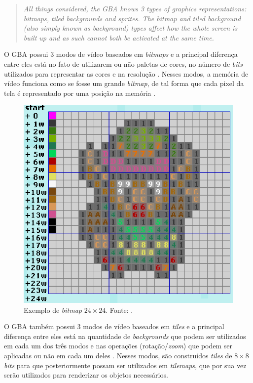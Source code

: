     \begin{quote}
      \textit{All things considered, the GBA knows 3 types of graphics representations: bitmaps, tiled backgrounds and sprites. The bitmap and tiled background (also simply known as background) types affect how the whole screen is built up and as such cannot both be activated at the same time.} \cite[p. 38]{tonc}
    \end{quote}

    O GBA possui 3 modos de vídeo baseados em \textit{bitmaps} e a principal diferença entre eles está no fato de utilizarem ou não paletas de cores, no número de \textit{bits} utilizados para representar as cores e na resolução \cite{harbour}. Nesses modos, a memória de vídeo funciona como se fosse um grande \textit{bitmap}, de tal forma que cada pixel da tela é representado por uma posição na memória \cite{tonc}.

    \begin{figure}[H]
    \centering \includegraphics[keepaspectratio=true,scale=0.6]{figuras/link-bitmap.eps}
      \caption[Exemplo de \textit{bitmap} $24\times24$]
        {Exemplo de \textit{bitmap} $24\times24$. Fonte: \cite{tonc}.}
      \label{link-bitmap}
    \end{figure}

    O GBA também possui 3 modos de vídeo baseados em \textit{tiles} e a principal diferença entre eles está na quantidade de \textit{backgrounds} que podem ser utilizados em cada um dos três modos e nas operações (rotação/\textit{zoom}) que podem ser aplicadas ou não em cada um deles \cite{harbour}. Nesses modos, são construídos \textit{tiles} de $8\times8$ \textit{bits} para que posteriormente possam ser utilizados em \textit{tilemaps}, que por sua vez serão utilizados para renderizar os objetos necessários. \cite{tonc}

